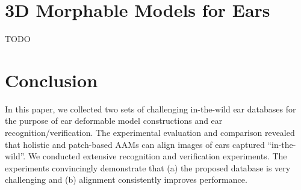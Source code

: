 

\section{3D Morphable Models for Ears}
TODO


\section{Conclusion}
In this paper, we collected two sets of challenging in-the-wild ear databases for the purpose of ear deformable model constructions and ear recognition/verification. The experimental evaluation and comparison revealed that holistic and patch-based AAMs can align images of ears captured ``in-the-wild''. We conducted extensive recognition and verification experiments. The experiments convincingly  demonstrate that (a) the proposed database is very challenging and (b) alignment consistently improves performance.